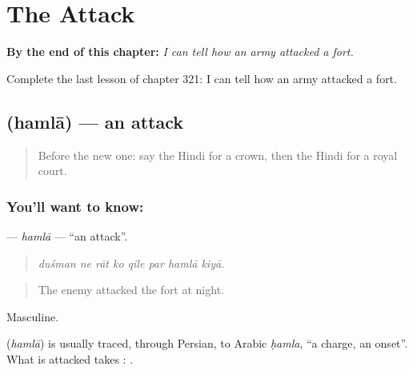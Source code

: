 
\chapter{The Attack}
\label{ch:hi-the-attack}

\begin{chapteropening}
\textbf{By the end of this chapter:} \emph{I can tell how an army attacked a fort.}

Complete the last lesson of chapter 321: I can tell how an army attacked a fort.
\end{chapteropening}

\section[\texorpdfstring{\hi{हमला} (hamlā)}{हमला (hamlā)}]{ (hamlā) — an attack}

\label{lesson:HI-C321-hamla}



\begin{quote}
Before the new one: say the Hindi for a crown, then the Hindi for a royal court.
\end{quote}

\subsection*{You'll want to know: }
\textbf{} — \emph{hamlā} — \textquotedblleft{}an attack\textquotedblright{}.

\begin{quote}
       
\end{quote}

\begin{quote}
\emph{duśman ne rāt ko qile par hamlā kiyā.}
\end{quote}

\begin{quote}
The enemy attacked the fort at night.
\end{quote}

Masculine.

\begin{cousinweb}
\textbf{} (\emph{hamlā}) is usually traced, through Persian, to Arabic \emph{ḥamla}, \textquotedblleft{}a charge, an onset\textquotedblright{}. What is attacked takes \textbf{}: \textbf{  }.
\end{cousinweb}


